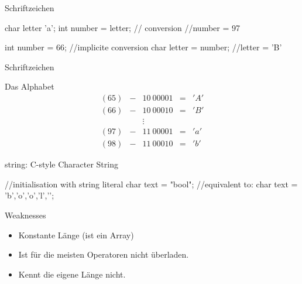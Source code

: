 \ifnum\conditionmacro=1 \documentclass[handout,usenames,dvipsnames]{beamer}\fi
\begin{document}
\begin{frame}[fragile]{Schriftzeichen}
\begin{TPCpp}
char letter 'a';
int number = letter; // conversion
//number = 97

int number = 66;
//implicite conversion
char letter = number;
//letter = 'B'
\end{TPCpp}
\end{frame}


\begin{frame}{Schriftzeichen}
\begin{block}{Das Alphabet}
\begin{align*}
(65)&-&10\ 00001&=&'A'\\
(66)&-&10\ 00010&=&'B'\\
&&\vdots&&\\
(97)&-&11\ 00001&=&'a'\\
(98)&-&11\ 00010&=&'b'
\end{align*}
\end{block}
\end{frame}


\begin{frame}[fragile]{string: C-style Character String}
\begin{TPCpp}
//initialisation with string literal
char text = "bool";
//equivalent to:
char text = {'b','o','o','l','\0'};
\end{TPCpp}

\begin{block}{Weaknesses}
\begin{itemize}
\item Konstante Länge (ist ein Array)
\item Ist für die meisten Operatoren nicht überladen.
\item Kennt die eigene Länge nicht.
\end{itemize}
\end{block}
\end{frame}
\end{document}
